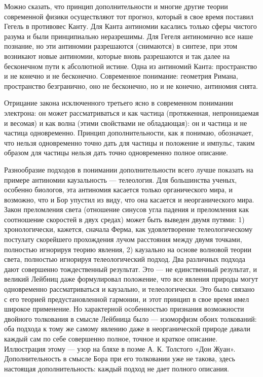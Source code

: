 Можно  сказать, что  принцип дополнительности  и многие  другие теории
современной  физики осуществляют  тот  прогноз, который  в свое  время
поставил  Гегель  в противовес  Канту.  Для  Канта антиномии  касались
только  сферы чистого  разума  и были  принципиально неразрешимы.  Для
Гегеля  антиномично все  наше познание,  но эти  антиномии разрешаются
(снимаются)  в синтезе,  при этом  возникают новые  антиномии, которые
вновь разрешаются и так далее на бесконечном пути к абсолютной истине.
Одна из  антиномий Канта: пространство  и не конечно и  не бесконечно.
Современное понимание: геометрия Римана, пространство безгранично, оно
не бесконечно, но и не конечно, антиномия снята.

Отрицание закона  исключенного третьего  ясно в  современном понимании
электрона:  он  может  рассматриваться  и  как  частица  (протяженная,
непроницаемая и весомая) и как волна (этими свойствами не обладающая):
он и частица и не  частица одновременно. Принцип дополнительности, как
я понимаю, обозначает, что нельзя  одновременно точно дать для частицы
и положение  и импульс,  таким образом для  частицы нельзя  дать точно
одновременно полное описание.

Разнообразие  подходов   в  понимании  дополнительности   всего  лучше
показать  на  примере  антиномии   каузальность  ---  телеология.  Для
большинства ученых,  особенно биологов, эта антиномия  касается только
органического мира,  и возможно, что  и Бор  упустил из виду,  что она
касается и  неорганического мира.  Закон преломления  света (отношение
синусов  угла  падения  и  преломления  как  соотношение  скоростей  в
двух  средах)  может быть  выведен  двумя  путями: 1)  хронологически,
кажется, сначала Ферма,  как удовлетворение телеологическому постулату
скорейшего   прохождения  лучом   расстояния   между  двумя   точками,
полностью игнорируя  теорию явления,  2) каузально на  основе волновой
теории   света,  полностью   игнорируя  телеологический   подход.  Два
различных  подхода дают  совершенно тождественный  результат. Это  ---
не  единственный  результат,  и   великий  Лейбниц  даже  формулировал
положение, что все явления  природы могут одновременно рассматриваться
и  каузально,  и  телеологически.  Это  было  связано  с  его  теорией
предустановленной гармонии, и  этот принцип в свое  время имел широкое
применение. Но характерной особенностью признания возможности двойного
толкования в смысле Лейбница было --- изоморфизм обоих толкований: оба
подхода к тому же самому  явлению даже в неорганической природе давали
каждый  сам по  себе  совершенно полное,  точное  и краткое  описание.
Иллюстрация этому --- узор на бляхе в поэме А. К. Толстого «Дон Жуан».
Дополнительность в смысле Бора при его толковании уже не такова, здесь
настоящая дополнительность: каждый подход не дает полного описания.

